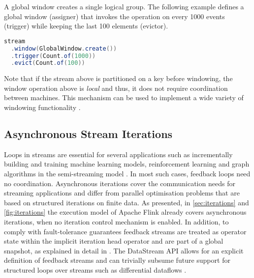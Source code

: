\noindent A global window creates a single logical group. The following example defines a global window (assigner) that invokes the operation on every 1000 events (trigger) while keeping the last 100 elements (evictor). 

\begin{lstlisting}[language=Java]
stream
  .window(GlobalWindow.create())
  .trigger(Count.of(1000))
  .evict(Count.of(100))
\end{lstlisting}

Note that if the stream above is partitioned on a key before  windowing, the window operation above is \textit{local} and thus, it does not require coordination between machines. This mechanism can be used to implement a wide variety of windowing functionality \cite{akidau2015dataflow}. 

\subsection{Asynchronous Stream Iterations}
\label{sec:stream-iterations}
Loops in streams are essential for several applications such as incrementally building and training machine learning models, reinforcement learning and graph algorithms in the semi-streaming model \cite{feigenbaum2005graph}.
In most such cases, feedback loops need no coordination. Asynchronous iterations cover the communication needs for streaming applications and differ from parallel optimisation problems that are based on structured iterations on finite data. As presented, in \autoref{sec:iterations} and \autoref{fig:iterations} the execution model of Apache Flink already covers asynchronous iterations, when no iteration control mechanism is enabled. In addition, to comply with fault-tolerance guarantees feedback streams are treated as operator state within the implicit iteration head operator and are part of a global snapshot, as explained in detail in \cite{carbone2015lightweight}. The DataStream API allows for an explicit definition of feedback streams and can trivially subsume future support for structured loops over streams such as differential dataflows \cite{murray2013naiad}.

